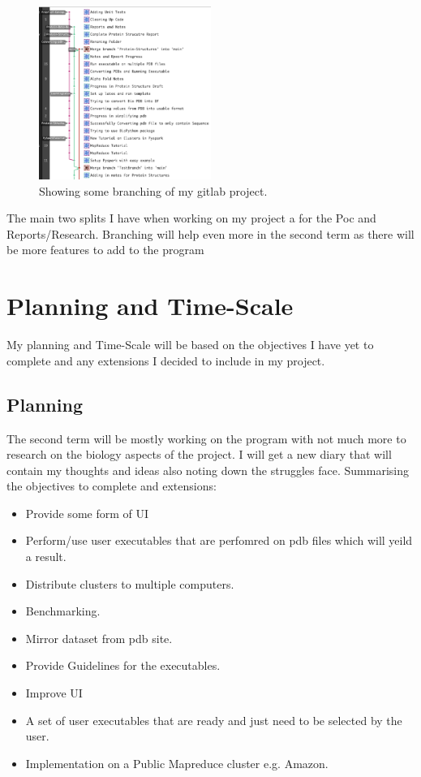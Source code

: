 \documentclass{report}
\begin{document}
\begin{figure}[H]
    \centering
    \includegraphics[width=0.5\textwidth]{Branching.png}
    \caption{\label{fig:Branching}Showing some branching of my gitlab project.}
\end{figure}

The main two splits I have when working on my project a for the Poc and Reports/Research. Branching will help even more in the second term as there will be more features to add to the program

\section{Planning and Time-Scale}

My planning and Time-Scale will be based on the objectives I have yet to complete and any extensions I decided to include in my project.

\subsection{Planning}

The second term will be mostly working on the program with not much more to research on the biology aspects of the project. I will get a new diary that will contain my thoughts and ideas also noting down the struggles face. Summarising the objectives to complete and extensions:

\begin{itemize}
    \item Provide some form of UI
    \item Perform/use user executables that are perfomred on pdb files which will yeild a result.
    \item Distribute clusters to multiple computers.
    \item Benchmarking.
    \item Mirror dataset from pdb site.
    \item Provide Guidelines for the executables.
    \item Improve UI
    \item A set of user executables that are ready and just need to be selected by the user.
    \item Implementation on a Public Mapreduce cluster e.g. Amazon.
\end{itemize}
\end{document}
